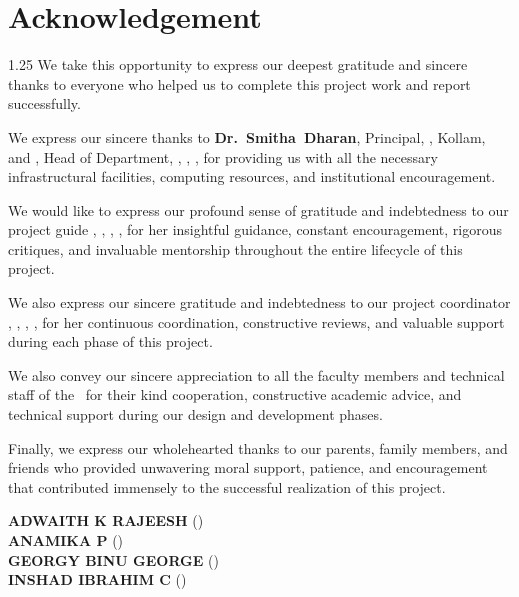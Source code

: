 \chapter*{Acknowledgement}%
%
\vspace{-15pt}

\begin{spacing}{1.25}
\noindent We take this opportunity to express our deepest gratitude and sincere thanks to everyone who helped us to complete this project work and report successfully.

\vspace{6pt}

\noindent We express our sincere thanks to \mbox{\textbf{Dr.~Smitha Dharan}}, Principal, \college, Kollam, and \mbox{\textbf{\hod}}, Head of Department, \dept, \college, \collegeplace, for providing us with all the necessary infrastructural facilities, computing resources, and institutional encouragement.

\vspace{6pt}

\noindent We would like to express our profound sense of gratitude and indebtedness to our project guide \mbox{\textbf{\guide}}, \guidedes, \dept, \college, for her insightful guidance, constant encouragement, rigorous critiques, and invaluable mentorship throughout the entire lifecycle of this project.

\vspace{6pt}

\noindent We also express our sincere gratitude and indebtedness to our project coordinator \mbox{\textbf{\coordinator}}, \coordinatordes, \dept, \college, for her continuous coordination, constructive reviews, and valuable support during each phase of this project.

\vspace{6pt}

\noindent We also convey our sincere appreciation to all the faculty members and technical staff of the \dept\ for their kind cooperation, constructive academic advice, and technical support during our design and development phases.

\vspace{6pt}

\noindent Finally, we express our wholehearted thanks to our parents, family members, and friends who provided unwavering moral support, patience, and encouragement that contributed immensely to the successful realization of this project.

\vspace*{14pt}
\begin{flushright}
	\textbf{ADWAITH K RAJEESH} (\rollnoA) \\[3pt]
	\textbf{ANAMIKA P} (\rollnoB) \\[3pt]
	\textbf{GEORGY BINU GEORGE} (\rollnoC) \\[3pt]
	\textbf{INSHAD IBRAHIM C} (\rollnoD)
\end{flushright}
\end{spacing}

\thispagestyle{plain}
